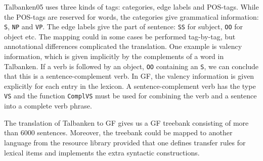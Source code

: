 \documentclass[runningheads,a4paper]{llncs}
\begin{document}
Talbanken05 uses three kinds of tags: categories, edge labels and POS-tags. 
While the POS-tags are reserved for words, the categories give grammatical information:
 \verb|S|, \verb|NP| and \verb|VP|.
The edge labels give the part of sentence: \verb|SS| for subject, 
\verb|OO| for object etc. 
%
The mapping could in some cases be performed tag-by-tag, but annotational
differences complicated the translation.
One example is valency information, which is given implicitly by the complements
of a word in Talbanken. If a verb is followed by an object, \verb-OO- containing an
\verb-S-, we can conclude that this is a sentence-complement verb.
In GF, the valency information is given explicitly for each entry in the lexicon.
A sentence-complement verb has the type \verb-VS- and the 
function \verb-ComplVS-  must be used for combining the verb and  a 
sentence into a complete verb phrase.

The translation of Talbanken to GF gives us a GF treebank consisting of more than
6000 sentences.
Moreover, the treebank could be mapped to another language from the 
resource library provided that one defines transfer rules for lexical
items and implements the extra syntactic constructions.
\end{document}
